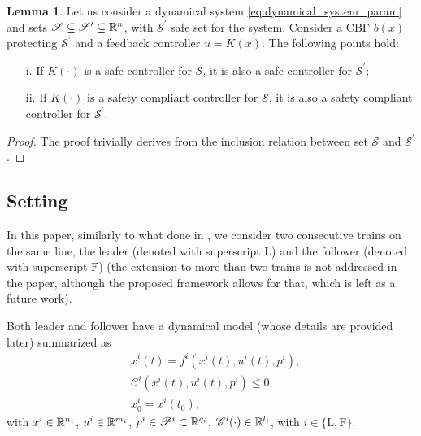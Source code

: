 \documentclass[letterpaper, 10 pt, conference]{ieeeconf}
\theoremstyle{definition}
\theoremstyle{nopoint}
\newtheorem{lemma}[theorem]{Lemma}
\begin{document}
\begin{lemma}\label{lem:protecting_barrier}
Let us consider a dynamical system  \eqref{eq:dynamical_system_param} and sets $\mathcal{S}\subseteq\mathcal{S}^\prime\subseteq \Bbb{R}^n$, with $\mathcal{S}^\prime$ safe set for the system. Consider a CBF $b(x)$ protecting $\mathcal{S}^\prime$ and a feedback controller $u=K(x)$. The following points hold:
\begin{itemize}
\item [i.] If $K(\cdot)$ is a safe controller for $\mathcal{S}$, it is also a safe controller for $\mathcal{S}^\prime$;
\item [ii.] If $K(\cdot)$ is a safety compliant controller for $\mathcal{S}$, it is also a safety compliant controller for $\mathcal{S}^\prime$.
\end{itemize}

\begin{proof}
The proof trivially derives from the inclusion relation between set  $\mathcal{S}$ and $\mathcal{S}^\prime$.
\end{proof}
\end{lemma}




\subsection{Setting}
\label{subsec:setting}
In this paper, similarly to what done in \cite{felez2019model}, we consider two consecutive trains on the same line, the leader (denoted with superscript $\mathrm{L}$) and the follower (denoted with superscript $\mathrm{F}$) (the extension to more than two trains is not addressed in the paper, although the proposed framework allows for that, which is left as a future work).

Both leader and follower have a dynamical model (whose details are provided later) summarized as 
\begin{subequations}\label{eq:dynamical_system_param_i}
\begin{align}
	& \dot{x}^i(t) = f^i(x^i(t), u^i(t),p^i), \label{eq:dynamical_system_param_i_dynamics}\\
	& \mathcal{C}^i(x^i(t),u^i(t),p^i)\leq 0, \label{eq:dynamical_system_param_i_constraints}\\
	& x_0^i=x^i(t_0), \label{eq:dynamical_system_param_i_initial}
\end{align}
\end{subequations}
with $x^i\in \Bbb{R}^{n_i}$, $u^i\in \Bbb{R}^{m_i}$,  $p^i\in \mathcal{P}^i\subset \Bbb{R}^{q_i}$, $\mathcal{C}^i(\cdot)\in \Bbb{R}^{l_i}$, with $i\in\{\mathrm{L}, \mathrm{F}\}$. 
\end{document}

